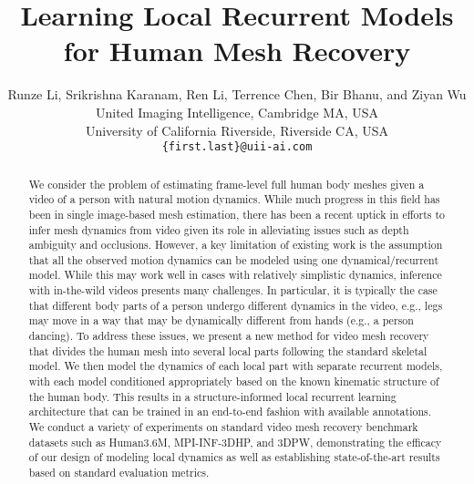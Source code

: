 \documentclass[10pt,twocolumn,letterpaper]{article}
\begin{document}
\title{Learning Local Recurrent Models for Human Mesh Recovery}

\author{Runze Li, Srikrishna Karanam, Ren Li, Terrence Chen, Bir Bhanu, and Ziyan Wu\\
United Imaging Intelligence, Cambridge MA, USA\\
University of California Riverside, Riverside CA, USA\\
{\tt \{first.last\}@uii-ai.com}
}


\ificcvfinal\thispagestyle{empty}\fi

\begin{abstract}

We consider the problem of estimating frame-level full human body meshes given a video of a person with natural motion dynamics. While much progress in this field has been in single image-based mesh estimation, there has been a recent uptick in efforts to infer mesh dynamics from video given its role in alleviating issues such as depth ambiguity and occlusions. However, a key limitation of existing work is the assumption that all the observed motion dynamics can be modeled using one dynamical/recurrent model. While this may work well in cases with relatively simplistic dynamics, inference with in-the-wild videos presents many challenges. In particular, it is typically the case that different body parts of a person undergo different dynamics in the video, e.g., legs may move in a way that may be dynamically different from hands (e.g., a person dancing). To address these issues, we present a new method for video mesh recovery that divides the human mesh into several local parts following the standard skeletal model. We then model the dynamics of each local part with separate recurrent models, with each model conditioned appropriately based on the known kinematic structure of the human body. This results in a structure-informed local recurrent learning architecture that can be trained in an end-to-end fashion with available annotations. We conduct a variety of experiments on standard video mesh recovery benchmark datasets such as Human3.6M, MPI-INF-3DHP, and 3DPW, demonstrating the efficacy of our design of modeling local dynamics as well as establishing state-of-the-art results based on standard evaluation metrics. 
  
\end{abstract}
\end{document}
